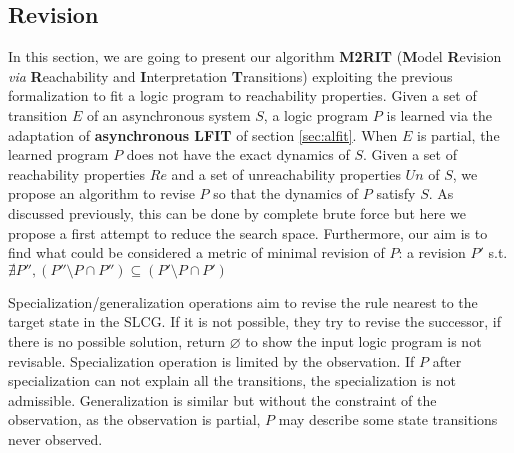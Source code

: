 \subsection{Revision}
\label{sec:algorithm}

    In this section, we are going to present our algorithm \textbf{M2RIT} (\textbf{M}odel \textbf{R}evision \textit{via} \textbf{R}eachability and \textbf{I}nterpretation \textbf{T}ransitions) exploiting the previous formalization to fit a logic program to reachability properties.
    Given a set of transition $E$ of an asynchronous system $S$, a logic program $P$ is learned via the adaptation of \textbf{asynchronous LFIT} of section \ref{sec:alfit}.
    When $E$ is partial, the learned program $P$ does not have the exact dynamics of $S$.
    Given a set of reachability properties $Re$ and a set of unreachability properties $Un$ of $S$, we propose an algorithm to revise $P$ so that the dynamics of $P$ satisfy $S$.
    As discussed previously, this can be done by complete brute force but here we propose a first attempt to reduce the search space.
    Furthermore, our aim is to find what could be considered a metric of minimal revision of $P$:
    a revision $P'$ s.t. $\nexists P'', (P''\setminus P \cap P'')\subseteq (P' \setminus P \cap P')$
   
    Specialization/generalization operations aim to revise the rule nearest to the target state in the SLCG. If it is not possible, they try to revise the successor, if there is no possible solution, return $\varnothing$ to show the input logic program is not revisable. Specialization operation is limited by the observation. If $P$ after specialization can not explain all the transitions, the specialization is not admissible. %
    Generalization is similar but without the constraint of the observation, as the observation is partial, $P$ may describe some state transitions never observed.
   
